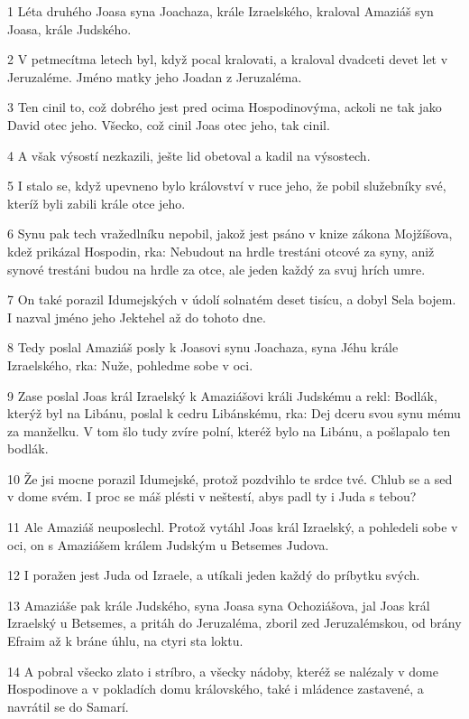 \par 1 Léta druhého Joasa syna Joachaza, krále Izraelského, kraloval Amaziáš syn Joasa, krále Judského.
\par 2 V petmecítma letech byl, když pocal kralovati, a kraloval dvadceti devet let v Jeruzaléme. Jméno matky jeho Joadan z Jeruzaléma.
\par 3 Ten cinil to, což dobrého jest pred ocima Hospodinovýma, ackoli ne tak jako David otec jeho. Všecko, což cinil Joas otec jeho, tak cinil.
\par 4 A však výsostí nezkazili, ješte lid obetoval a kadil na výsostech.
\par 5 I stalo se, když upevneno bylo království v ruce jeho, že pobil služebníky své, kteríž byli zabili krále otce jeho.
\par 6 Synu pak tech vražedlníku nepobil, jakož jest psáno v knize zákona Mojžíšova, kdež prikázal Hospodin, rka: Nebudout na hrdle trestáni otcové za syny, aniž synové trestáni budou na hrdle za otce, ale jeden každý za svuj hrích umre.
\par 7 On také porazil Idumejských v údolí solnatém deset tisícu, a dobyl Sela bojem. I nazval jméno jeho Jektehel až do tohoto dne.
\par 8 Tedy poslal Amaziáš posly k Joasovi synu Joachaza, syna Jéhu krále Izraelského, rka: Nuže, pohledme sobe v oci.
\par 9 Zase poslal Joas král Izraelský k Amaziášovi králi Judskému a rekl: Bodlák, kterýž byl na Libánu, poslal k cedru Libánskému, rka: Dej dceru svou synu mému za manželku. V tom šlo tudy zvíre polní, kteréž bylo na Libánu, a pošlapalo ten bodlák.
\par 10 Že jsi mocne porazil Idumejské, protož pozdvihlo te srdce tvé. Chlub se a sed v dome svém. I proc se máš plésti v neštestí, abys padl ty i Juda s tebou?
\par 11 Ale Amaziáš neuposlechl. Protož vytáhl Joas král Izraelský, a pohledeli sobe v oci, on s Amaziášem králem Judským u Betsemes Judova.
\par 12 I poražen jest Juda od Izraele, a utíkali jeden každý do príbytku svých.
\par 13 Amaziáše pak krále Judského, syna Joasa syna Ochoziášova, jal Joas král Izraelský u Betsemes, a pritáh do Jeruzaléma, zboril zed Jeruzalémskou, od brány Efraim až k bráne úhlu, na ctyri sta loktu.
\par 14 A pobral všecko zlato i stríbro, a všecky nádoby, kteréž se nalézaly v dome Hospodinove a v pokladích domu královského, také i mládence zastavené, a navrátil se do Samarí.
